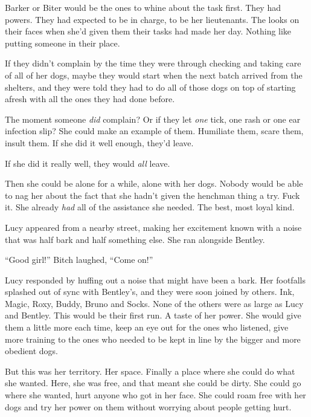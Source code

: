 Barker or Biter would be the ones to whine about the task first.  They had powers.  They had expected to be in charge, to be her lieutenants.  The looks on their faces when she'd given them their tasks had made her day.  Nothing like putting someone in their place.



If they didn't complain by the time they were through checking and taking care of all of her dogs, maybe they would start when the next batch arrived from the shelters, and they were told they had to do all of those dogs on top of starting afresh with all the ones they had done before.



The moment someone \emph{did} complain?  Or if they let \emph{one} tick, one rash or one ear infection slip?  She could make an example of them.  Humiliate them, scare them, insult them.  If she did it well enough, they'd leave.



If she did it really well, they would \emph{all} leave.



Then she could be alone for a while, alone with her dogs.  Nobody would be able to nag her about the fact that she hadn't given the henchman thing a try.  Fuck it.  She already\emph{ had} all of the assistance she needed.  The best, most loyal kind.



Lucy appeared from a nearby street, making her excitement known with a noise that was half bark and half something else.  She ran alongside Bentley.



``Good girl!''  Bitch laughed, ``Come on!''



Lucy responded by huffing out a noise that might have been a bark.  Her footfalls splashed out of sync with Bentley's, and they were soon joined by others.  Ink, Magic, Roxy, Buddy, Bruno and Socks.  None of the others were as large as Lucy and Bentley.  This would be their first run.  A taste of her power.  She would give them a little more each time, keep an eye out for the ones who listened, give more training to the ones who needed to be kept in line by the bigger and more obedient dogs.



But this was her territory.  Her space.  Finally a place where she could do what she wanted.  Here, she was free, and that meant she could be dirty.  She could go where she wanted, hurt anyone who got in her face.  She could roam free with her dogs and try her power on them without worrying about people getting hurt.



